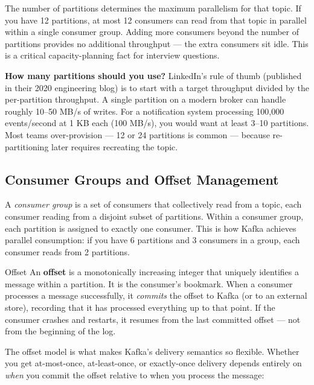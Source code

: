 \documentclass[11pt,a4paper]{article}
\begin{document}
The number of partitions determines the maximum parallelism for that topic. If you have 12 partitions, at most 12 consumers can read from that topic in parallel within a single consumer group. Adding more consumers beyond the number of partitions provides no additional throughput --- the extra consumers sit idle. This is a critical capacity-planning fact for interview questions.

\begin{thinkbox}
\textbf{How many partitions should you use?} LinkedIn's rule of thumb (published in their 2020 engineering blog) is to start with a target throughput divided by the per-partition throughput. A single partition on a modern broker can handle roughly 10--50 MB/s of writes. For a notification system processing 100,000 events/second at 1 KB each (100 MB/s), you would want at least 3--10 partitions. Most teams over-provision --- 12 or 24 partitions is common --- because re-partitioning later requires recreating the topic.
\end{thinkbox}

\subsection{Consumer Groups and Offset Management}

A \textit{consumer group} is a set of consumers that collectively read from a topic, each consumer reading from a disjoint subset of partitions. Within a consumer group, each partition is assigned to exactly one consumer. This is how Kafka achieves parallel consumption: if you have 6 partitions and 3 consumers in a group, each consumer reads from 2 partitions.

\begin{termbox}{Offset}
An \textbf{offset} is a monotonically increasing integer that uniquely identifies a message within a partition. It is the consumer's bookmark. When a consumer processes a message successfully, it \textit{commits} the offset to Kafka (or to an external store), recording that it has processed everything up to that point. If the consumer crashes and restarts, it resumes from the last committed offset --- not from the beginning of the log.
\end{termbox}

The offset model is what makes Kafka's delivery semantics so flexible. Whether you get at-most-once, at-least-once, or exactly-once delivery depends entirely on \textit{when} you commit the offset relative to when you process the message:
\end{document}
